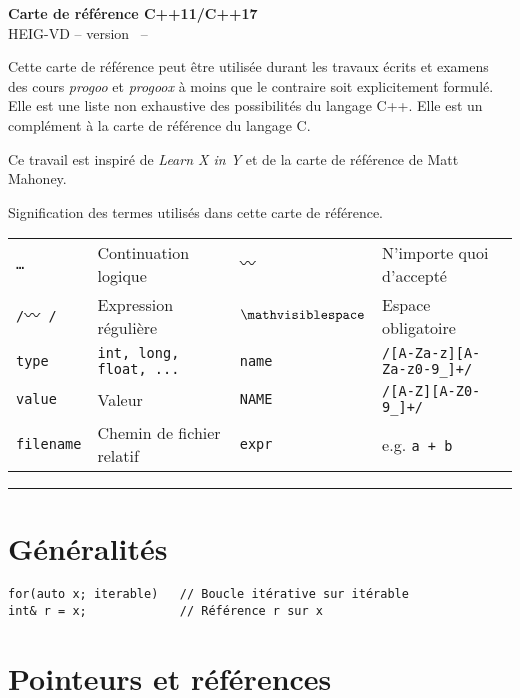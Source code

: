 \documentclass{article}
\newcommand{\etc}{\small \ldots}
\newcommand{\any}{$\hzigzag$~}
\newcommand{\spc}{$\mathvisiblespace$}
\newcommand{\cd}{\lstinline}
\begin{document}
\begin{multicols*}{3}

\begin{center}
  {\Large \bf Carte de référence C++11/C++17} \\
  HEIG-VD -- version \revision \ -- \revisiondate \\
\end{center}

Cette carte de référence peut être utilisée durant les travaux écrits et examens
des cours \emph{progoo} et \emph{progoox} à moins que le contraire soit explicitement formulé.
Elle est une liste non exhaustive des possibilités du langage C++. Elle est un complément à la carte
de référence du langage C.

Ce travail est inspiré de \emph{Learn X in Y} et de la carte de référence de Matt Mahoney.

Signification des termes utilisés dans cette carte de référence.

\begin{tabularx}{\linewidth}{
  >{\hsize=0.5\hsize}X%
  >{\hsize=1.5\hsize}X%
  >{\hsize=0.5\hsize}X%
  >{\hsize=1.5\hsize}X%
  }

  \tt \etc      & Continuation logique    & \tt \any    & N'importe quoi d'accepté \\
  \tt /\any/    & Expression régulière    & \tt \spc    & Espace obligatoire \\
  \cd{type}     & \tt int, long, float, ... & \cd{name} & \tt /[A-Za-z][A-Za-z0-9\_]+/ \\
  \cd{value}    & Valeur & \cd{NAME} & \tt /[A-Z][A-Z0-9\_]+/ \\
  \cd{filename} & Chemin de fichier relatif & \cd{expr}   & e.g. \tt a + b \\
\end{tabularx}
\hrule

\section*{Généralités}

\begin{lstlisting}
for(auto x; iterable)   // Boucle itérative sur itérable
int& r = x;             // Référence r sur x
\end{lstlisting}

\section*{Pointeurs et références}


\end{multicols*}
\end{document}
